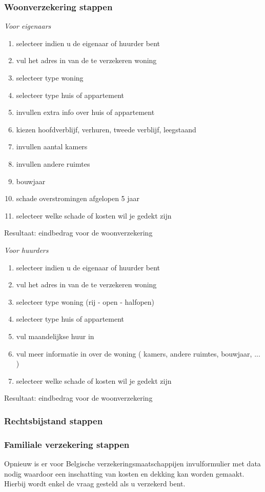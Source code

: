 \subsubsection{Woonverzekering stappen}
\emph{Voor eigenaars}

\begin{enumerate}[label=Stap \arabic*:]
	\item selecteer indien u de eigenaar of huurder bent
	\item vul het adres in van de te verzekeren woning
	\item selecteer type woning
	\item selecteer type huis of appartement
	\item invullen extra info over huis of appartement
	\item kiezen hoofdverblijf, verhuren, tweede verblijf, leegstaand
	\item invullen aantal kamers
	\item invullen andere ruimtes
	\item bouwjaar
	\item schade overstromingen afgelopen 5 jaar
	\item selecteer welke schade of kosten wil je gedekt zijn
\end{enumerate}      
Resultaat: eindbedrag voor de woonverzekering

\emph{Voor huurders}

\begin{enumerate}[label=Stap \arabic*:]
	\item selecteer indien u de eigenaar of huurder bent
	\item vul het adres in van de te verzekeren woning
	\item selecteer type woning (rij - open - halfopen)
	\item selecteer type huis of appartement
	\item vul maandelijkse huur in
	\item vul meer informatie in over de woning ( kamers, andere ruimtes, bouwjaar, ... )
	\item selecteer welke schade of kosten wil je gedekt zijn
\end{enumerate}
Resultaat: eindbedrag voor de woonverzekering

\subsubsection{Rechtsbijstand stappen}


\subsubsection{Familiale verzekering stappen}
Opnieuw is er voor Belgische verzekeringsmaatschappijen invulformulier met data nodig waardoor een inschatting van kosten en dekking kan worden gemaakt.
Hierbij wordt enkel de vraag gesteld als u verzekerd bent.


